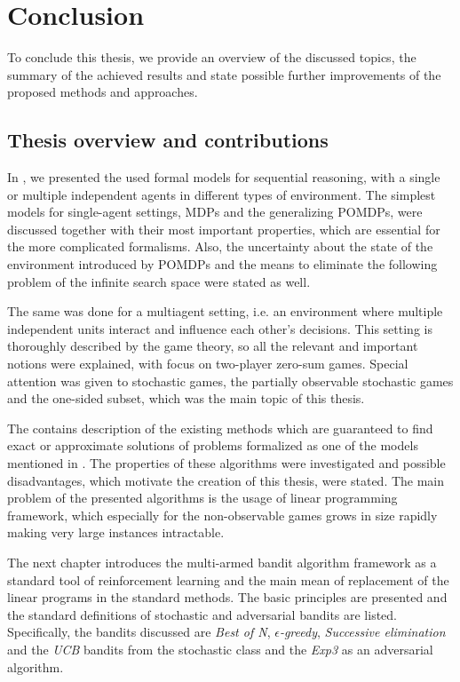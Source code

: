 \documentclass[../main.tex]{subfiles}
\begin{document}
\chapter{Conclusion}\label{end}
To conclude this thesis, we provide an overview of the discussed topics, the summary of the achieved results and state possible further improvements of the proposed methods and approaches.

\section{Thesis overview and contributions}
In , we presented the used formal models for sequential reasoning, with a single or multiple independent agents in different types of environment.
The simplest models for single-agent settings, MDPs and the generalizing POMDPs, were discussed together with their most important properties, which are essential for the more complicated formalisms.
Also, the uncertainty about the state of the environment introduced by POMDPs and the means to eliminate the following problem of the infinite search space were stated as well.

The same was done for a multiagent setting, i.e. an environment where multiple independent units interact and influence each other's decisions.
This setting is thoroughly described by the game theory, so all the relevant and important notions were explained, with focus on two-player zero-sum games.
Special attention was given to stochastic games, the partially observable stochastic games and the one-sided subset, which was the main topic of this thesis.

The  contains description of the existing methods which are guaranteed to find exact or approximate solutions of problems formalized as one of the models mentioned in .
The properties of these algorithms were investigated and possible disadvantages, which motivate the creation of this thesis, were stated.
The main problem of the presented algorithms is the usage of linear programming framework, which especially for the non-observable games grows in size rapidly making very large instances intractable.

The next chapter  introduces the multi-armed bandit algorithm framework as a standard tool of reinforcement learning and the main mean of replacement of the linear programs in the standard methods.
The basic principles are presented and the standard definitions of stochastic and adversarial bandits are listed.
Specifically, the bandits discussed are \textit{Best of N}, \textit{$\epsilon$-greedy}, \textit{Successive elimination} and the \textit{UCB} bandits from the stochastic class and the \textit{Exp3} as an adversarial algorithm.
\end{document}
